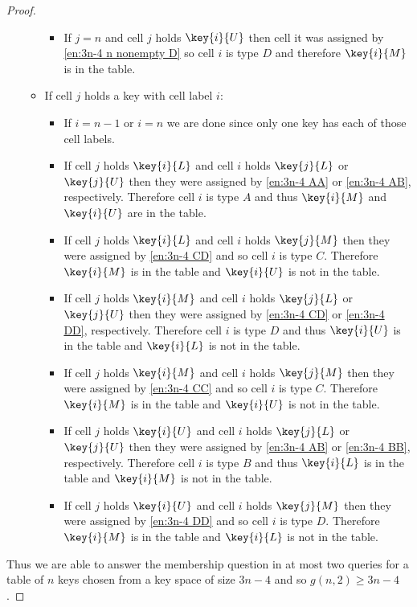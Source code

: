 \begin{proof}
\begin{itemize}
\begin{itemize}
\begin{itemize}
						\item If $j=n$ and cell $j$ holds $\key{i}{U}$ then cell it was assigned by \ref{en:3n-4 n nonempty D} so cell $i$ is type $D$ and therefore $\key{i}{M}$ is in the table.
					\end{itemize}
				\item If cell $j$ holds a key with cell label $i$:
					\begin{itemize}
						\item If $i=n-1$ or $i=n$ we are done since only one key has each of those cell labels.
						\item If cell $j$ holds $\key{i}{L}$ and cell $i$ holds $\key{j}{L}$ or $\key{j}{U}$ then they were assigned by \ref{en:3n-4 AA} or \ref{en:3n-4 AB}, respectively. Therefore cell $i$ is type $A$ and thus $\key{i}{M}$ and $\key{i}{U}$ are in the table.
						\item If cell $j$ holds $\key{i}{L}$ and cell $i$ holds $\key{j}{M}$ then they were assigned by \ref{en:3n-4 CD} and so cell $i$ is type $C$. Therefore $\key{i}{M}$ is in the table and $\key{i}{U}$ is not in the table.
						\item If cell $j$ holds $\key{i}{M}$ and cell $i$ holds $\key{j}{L}$ or $\key{j}{U}$ then they were assigned by \ref{en:3n-4 CD} or \ref{en:3n-4 DD}, respectively. Therefore cell $i$ is type $D$ and thus $\key{i}{U}$ is in the table and $\key{i}{L}$ is not in the table.
						\item If cell $j$ holds $\key{i}{M}$ and cell $i$ holds $\key{j}{M}$ then they were assigned by \ref{en:3n-4 CC} and so cell $i$ is type $C$. Therefore $\key{i}{M}$ is in the table and $\key{i}{U}$ is not in the table.
						\item If cell $j$ holds $\key{i}{U}$ and cell $i$ holds $\key{j}{L}$ or $\key{j}{U}$ then they were assigned by \ref{en:3n-4 AB} or \ref{en:3n-4 BB}, respectively. Therefore cell $i$ is type $B$ and thus $\key{i}{L}$ is in the table and $\key{i}{M}$ is not in the table.
						\item If cell $j$ holds $\key{i}{U}$ and cell $i$ holds $\key{j}{M}$ then they were assigned by \ref{en:3n-4 DD} and so cell $i$ is type $D$. Therefore $\key{i}{M}$ is in the table and $\key{i}{L}$ is not in the table.
					\end{itemize}
			\end{itemize}
	\end{itemize}
	Thus we are able to answer the membership question in at most two queries for a table of $n$ keys chosen from a key space of size $3n-4$ and so $g\left(n,2\right) \geq 3n-4$.
\end{proof}


